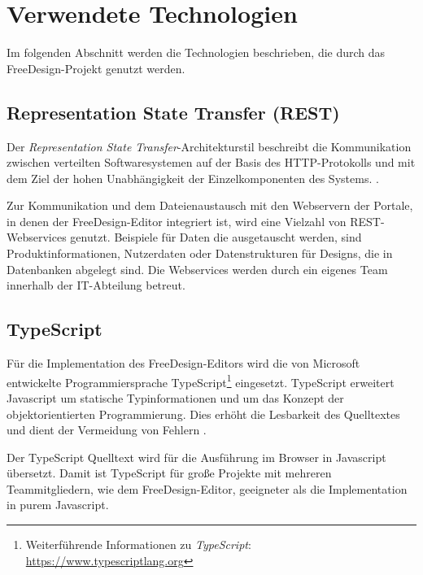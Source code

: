
\section{Verwendete Technologien}
Im folgenden Abschnitt werden die Technologien beschrieben, die durch das FreeDesign-Projekt genutzt werden. 

\subsection{Representation State Transfer (REST)}
Der \emph{Representation State Transfer}-Architekturstil beschreibt die Kommunikation zwischen verteilten Softwaresystemen auf der Basis des HTTP-Protokolls und mit dem Ziel der hohen Unabhängigkeit der Einzelkomponenten des Systems. \autocite[vgl.][105-106]{Fielding2000}.

Zur Kommunikation und dem Dateienaustausch mit den Webservern der Portale, in denen der FreeDesign-Editor integriert ist, wird eine Vielzahl von REST-Webservices genutzt. 
Beispiele für Daten die ausgetauscht werden, sind Produktinformationen, Nutzerdaten oder Datenstrukturen für Designs, die in Datenbanken abgelegt sind.
Die Webservices werden durch ein eigenes Team innerhalb der IT-Abteilung betreut.  

\subsection{TypeScript}
Für die Implementation des FreeDesign-Editors wird die von Microsoft entwickelte Programmiersprache TypeScript\footnote{Weiterführende Informationen zu \emph{TypeScript}: \url{https://www.typescriptlang.org}} eingesetzt. TypeScript erweitert Javascript um statische Typinformationen und um das Konzept der objektorientierten Programmierung. Dies erhöht die Lesbarkeit des Quelltextes und dient der Vermeidung von Fehlern \autocite[vgl.][S. 111]{Zeigermann2014}. 

Der TypeScript Quelltext wird für die Ausführung im Browser in Javascript übersetzt. Damit ist TypeScript für große Projekte mit mehreren Teammitgliedern, wie dem FreeDesign-Editor, geeigneter als die Implementation in purem Javascript.

